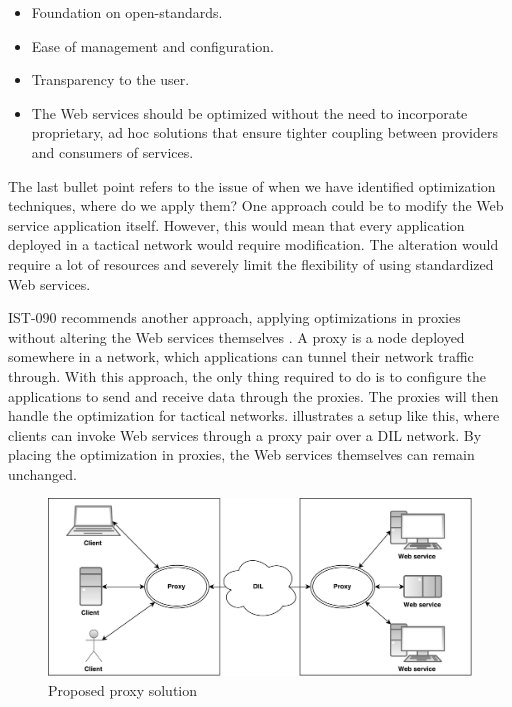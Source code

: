 \begin{itemize}

    \item Foundation on open-standards.

    \item Ease of management and configuration.

    \item Transparency to the user.

    \item The Web services should be optimized without the need to incorporate
    proprietary, ad hoc solutions that ensure tighter coupling between providers
    and consumers of services.

\end{itemize}

The last bullet point refers to the issue of when we have identified
optimization techniques, where do we apply them? One approach could be to modify
the Web service application itself. However, this would mean that every
application deployed in a tactical network would require modification. The
alteration would require a lot of resources and severely limit the flexibility
of using standardized Web services.

IST-090 recommends another approach, applying optimizations in proxies without
altering the Web services themselves \cite{ist-090}. A proxy is a node deployed
somewhere in a network, which applications can tunnel their network traffic
through. With this approach, the only thing required to do is to configure the
applications to send and receive data through the proxies. The proxies will then
handle the optimization for tactical networks.
 illustrates a setup like this, where
clients can invoke Web services through a proxy pair over a DIL network. By
placing the optimization in proxies, the Web services themselves can remain
unchanged.

\begin{figure}[h] \includegraphics[width=\textwidth]{images/dil.pdf}
\caption{Proposed proxy solution} \label{figure-proposed-proxy-solution}
\end{figure}

